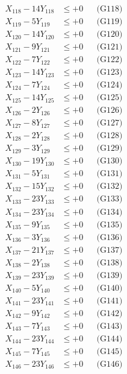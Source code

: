 \documentclass[a4paper,10pt]{article}
\begin{document}
{\begin{align}
\allowbreak
X_{118} - 14Y_{118} &\leq +0 && \text{(G118)} \\
X_{119} - 5Y_{119} &\leq +0 && \text{(G119)} \\
X_{120} - 14Y_{120} &\leq +0 && \text{(G120)} \\
X_{121} - 9Y_{121} &\leq +0 && \text{(G121)} \\
X_{122} - 7Y_{122} &\leq +0 && \text{(G122)} \\
X_{123} - 14Y_{123} &\leq +0 && \text{(G123)} \\
X_{124} - 7Y_{124} &\leq +0 && \text{(G124)} \\
X_{125} - 14Y_{125} &\leq +0 && \text{(G125)} \\
X_{126} - 2Y_{126} &\leq +0 && \text{(G126)} \\
X_{127} - 8Y_{127} &\leq +0 && \text{(G127)} \\
\allowbreak
X_{128} - 2Y_{128} &\leq +0 && \text{(G128)} \\
X_{129} - 3Y_{129} &\leq +0 && \text{(G129)} \\
X_{130} - 19Y_{130} &\leq +0 && \text{(G130)} \\
X_{131} - 5Y_{131} &\leq +0 && \text{(G131)} \\
X_{132} - 15Y_{132} &\leq +0 && \text{(G132)} \\
X_{133} - 23Y_{133} &\leq +0 && \text{(G133)} \\
X_{134} - 23Y_{134} &\leq +0 && \text{(G134)} \\
X_{135} - 9Y_{135} &\leq +0 && \text{(G135)} \\
X_{136} - 3Y_{136} &\leq +0 && \text{(G136)} \\
X_{137} - 21Y_{137} &\leq +0 && \text{(G137)} \\
\allowbreak
X_{138} - 2Y_{138} &\leq +0 && \text{(G138)} \\
X_{139} - 23Y_{139} &\leq +0 && \text{(G139)} \\
X_{140} - 5Y_{140} &\leq +0 && \text{(G140)} \\
X_{141} - 23Y_{141} &\leq +0 && \text{(G141)} \\
X_{142} - 9Y_{142} &\leq +0 && \text{(G142)} \\
X_{143} - 7Y_{143} &\leq +0 && \text{(G143)} \\
X_{144} - 23Y_{144} &\leq +0 && \text{(G144)} \\
X_{145} - 7Y_{145} &\leq +0 && \text{(G145)} \\
X_{146} - 23Y_{146} &\leq +0 && \text{(G146)} \\

\end{align}}
\end{document}
